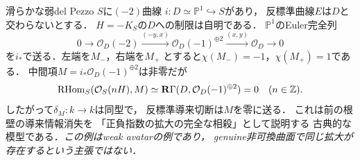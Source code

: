 \begin{remark}
\label{ex:euler-cancellation}
滑らかな弱del Pezzo $S$に$(-2)$曲線
$i:D\simeq\mathbb P^1\hookrightarrow S$があり，
反標準曲線$E$は$D$と交わらないとする．
$H=-K_S$の$D$への制限は自明である．
$\mathbb P^1$のEuler完全列
\[
0\to\mathcal O_D(-2)\xrightarrow{(-y,x)}
 \mathcal O_D(-1)^{\oplus2}
 \xrightarrow{(x,y)}\mathcal O_D\to0
\]
を$i_*$で送る．左端を$M_-$，右端を$M_+$
とすると$\chi(M_-)=-1$，$\chi(M_+)=1$である．
中間項$M=i_*\mathcal O_D(-1)^{\oplus2}$は非零だが
\[
\operatorname{RHom}_S(\mathcal O_S(nH),M)
 \simeq\mathbf R\Gamma(D,\mathcal O_D(-1)^{\oplus2})=0
 \quad(n\in\mathbb Z).
\]
したがって$\delta_M:k\to k$は同型で，
反標準導来切断は$M$を零に送る．
これは前の根壁の導来情報消失を
「正負指数の拡大の完全な相殺」として説明する
古典的な模型である．\emph{この例はweak avatarの例であり，
genuine非可換曲面で同じ拡大が存在するという主張ではない．}
\end{remark}
